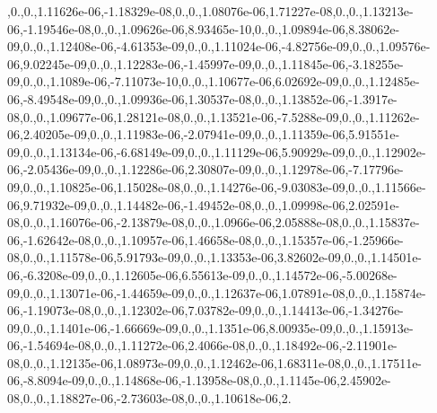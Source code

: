 \begin{DoxyCompactItemize}
,0.,0.,1.\-11626e-\/06,-\/1.\-18329e-\/08,0.,0.,1.\-08076e-\/06,1.\-71227e-\/08,0.,0.,1.\-13213e-\/06,-\/1.\-19546e-\/08,0.,0.,1.\-09626e-\/06,8.\-93465e-\/10,0.,0.,1.\-09894e-\/06,8.\-38062e-\/09,0.,0.,1.\-12408e-\/06,-\/4.\-61353e-\/09,0.,0.,1.\-11024e-\/06,-\/4.\-82756e-\/09,0.,0.,1.\-09576e-\/06,9.\-02245e-\/09,0.,0.,1.\-12283e-\/06,-\/1.\-45997e-\/09,0.,0.,1.\-11845e-\/06,-\/3.\-18255e-\/09,0.,0.,1.\-1089e-\/06,-\/7.\-11073e-\/10,0.,0.,1.\-10677e-\/06,6.\-02692e-\/09,0.,0.,1.\-12485e-\/06,-\/8.\-49548e-\/09,0.,0.,1.\-09936e-\/06,1.\-30537e-\/08,0.,0.,1.\-13852e-\/06,-\/1.\-3917e-\/08,0.,0.,1.\-09677e-\/06,1.\-28121e-\/08,0.,0.,1.\-13521e-\/06,-\/7.\-5288e-\/09,0.,0.,1.\-11262e-\/06,2.\-40205e-\/09,0.,0.,1.\-11983e-\/06,-\/2.\-07941e-\/09,0.,0.,1.\-11359e-\/06,5.\-91551e-\/09,0.,0.,1.\-13134e-\/06,-\/6.\-68149e-\/09,0.,0.,1.\-11129e-\/06,5.\-90929e-\/09,0.,0.,1.\-12902e-\/06,-\/2.\-05436e-\/09,0.,0.,1.\-12286e-\/06,2.\-30807e-\/09,0.,0.,1.\-12978e-\/06,-\/7.\-17796e-\/09,0.,0.,1.\-10825e-\/06,1.\-15028e-\/08,0.,0.,1.\-14276e-\/06,-\/9.\-03083e-\/09,0.,0.,1.\-11566e-\/06,9.\-71932e-\/09,0.,0.,1.\-14482e-\/06,-\/1.\-49452e-\/08,0.,0.,1.\-09998e-\/06,2.\-02591e-\/08,0.,0.,1.\-16076e-\/06,-\/2.\-13879e-\/08,0.,0.,1.\-0966e-\/06,2.\-05888e-\/08,0.,0.,1.\-15837e-\/06,-\/1.\-62642e-\/08,0.,0.,1.\-10957e-\/06,1.\-46658e-\/08,0.,0.,1.\-15357e-\/06,-\/1.\-25966e-\/08,0.,0.,1.\-11578e-\/06,5.\-91793e-\/09,0.,0.,1.\-13353e-\/06,3.\-82602e-\/09,0.,0.,1.\-14501e-\/06,-\/6.\-3208e-\/09,0.,0.,1.\-12605e-\/06,6.\-55613e-\/09,0.,0.,1.\-14572e-\/06,-\/5.\-00268e-\/09,0.,0.,1.\-13071e-\/06,-\/1.\-44659e-\/09,0.,0.,1.\-12637e-\/06,1.\-07891e-\/08,0.,0.,1.\-15874e-\/06,-\/1.\-19073e-\/08,0.,0.,1.\-12302e-\/06,7.\-03782e-\/09,0.,0.,1.\-14413e-\/06,-\/1.\-34276e-\/09,0.,0.,1.\-1401e-\/06,-\/1.\-66669e-\/09,0.,0.,1.\-1351e-\/06,8.\-00935e-\/09,0.,0.,1.\-15913e-\/06,-\/1.\-54694e-\/08,0.,0.,1.\-11272e-\/06,2.\-4066e-\/08,0.,0.,1.\-18492e-\/06,-\/2.\-11901e-\/08,0.,0.,1.\-12135e-\/06,1.\-08973e-\/09,0.,0.,1.\-12462e-\/06,1.\-68311e-\/08,0.,0.,1.\-17511e-\/06,-\/8.\-8094e-\/09,0.,0.,1.\-14868e-\/06,-\/1.\-13958e-\/08,0.,0.,1.\-1145e-\/06,2.\-45902e-\/08,0.,0.,1.\-18827e-\/06,-\/2.\-73603e-\/08,0.,0.,1.\-10618e-\/06,2.
\end{DoxyCompactItemize}
